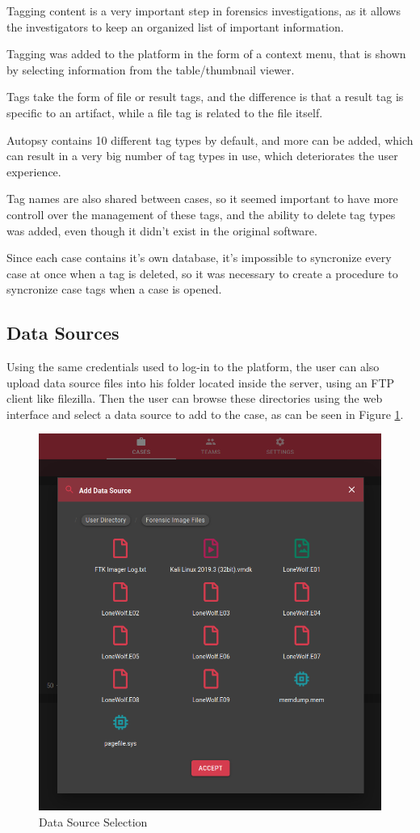Tagging content is a very important step in forensics investigations, as it allows the investigators to keep an organized list of important information.

Tagging was added to the platform in the form of a context menu, that is shown by selecting information from the table/thumbnail viewer.

Tags take the form of file or result tags, and the difference is that a result tag is specific to an artifact, while a file tag is related to the file itself.

Autopsy contains 10 different tag types by default, and more can be added, which can result in a very big number of tag types in use, which deteriorates the user experience.

Tag names are also shared between cases, so it seemed important to have more controll over the management of these tags, and the ability to delete tag types was added, even though it didn't exist in the original software.

Since each case contains it's own database, it's impossible to syncronize every case at once when a tag is deleted, so it was necessary to create a procedure to syncronize case tags when a case is opened.
 

\subsection{Data Sources}

Using the same credentials used to log-in to the platform, the user can also upload data source files into his folder located inside the server, using an FTP client like filezilla.
Then the user can browse these directories using the web interface and select a data source to add to the case, as can be seen in Figure \ref{fig:datasource}.

\begin{figure}[ht]
 \centering
 \includegraphics[width=0.75\linewidth]{imgs/data-sources.png}
 \caption{Data Source Selection}
 \label{fig:datasource}
\end{figure}

